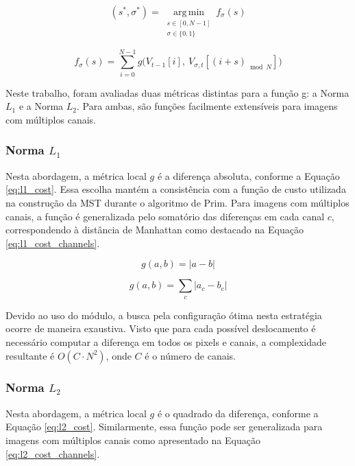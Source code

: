 \documentclass[12pt]{article}
\begin{document}
\begin{equation} \label{eq:all_alignments}
    (s^*, \sigma^*) = \operatorname*{arg\,min}_{\substack{s \in [0, N-1] \\ \sigma \in \{0, 1\}}} f_\sigma(s)
\end{equation}

\begin{equation} \label{eq:alignment_general} 
  f_\sigma(s) = \sum_{i=0}^{N-1} g\Big(V_{t-1}[i], \ V_{\sigma, t}[(i + s)_{\bmod N}]\Big)
\end{equation}



Neste trabalho, foram avaliadas duas métricas distintas para a função g: a Norma $L_1$ e a Norma $L_2$.
Para ambas, são funções facilmente extensíveis para imagens com múltiplos canais.

\subsubsection{Norma $L_1$}
Nesta abordagem, a métrica local $g$ é a diferença absoluta, conforme a Equação \ref{eq:l1_cost}.
Essa escolha mantém a consistência com a função de custo utilizada na construção da MST durante o algoritmo de Prim.
Para imagens com múltiplos canais, a função é generalizada
pelo somatório das diferenças em cada canal $c$, correspondendo à distância de Manhattan como
destacado na Equação \ref{eq:l1_cost_channels}.

\begin{equation} \label{eq:l1_cost}
    g(a, b) = |a - b|
\end{equation}

\begin{equation} \label{eq:l1_cost_channels}
    g(a, b) = \sum_{c}|a_c - b_c|
\end{equation}

Devido ao uso do módulo, a busca pela configuração ótima nesta estratégia ocorre de maneira exaustiva.
Visto que para cada possível deslocamento é necessário computar a diferença em todos os pixels e canais,
a complexidade resultante é $O(C \cdot N^2)$, onde $C$ é o número de canais.

\subsubsection{Norma $L_2$}
Nesta abordagem, a métrica local $g$ é o quadrado da diferença, conforme a Equação \ref{eq:l2_cost}.
Similarmente, essa função pode ser generalizada para imagens com múltiplos canais como apresentado na
Equação \ref{eq:l2_cost_channels}.
\end{document}
